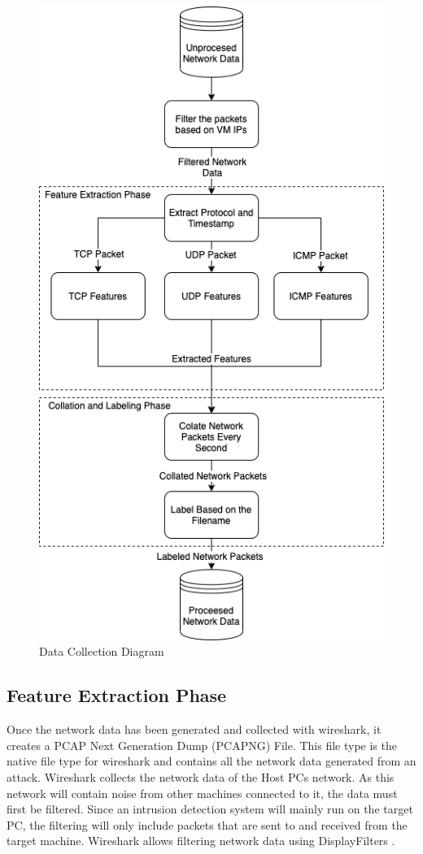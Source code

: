 \begin{figure}[H]
 \centering
 \includegraphics[scale = 0.5]{Images/datacollection.png}
 \caption{Data Collection Diagram}
 \label{fig:dcd}
\end{figure}
\subsection{Feature Extraction Phase}

Once the network data has been generated and collected with wireshark, it creates a PCAP Next Generation Dump (PCAPNG) File. This file type is the native file type for wireshark and contains all the network data generated from an attack. Wireshark collects the network data of the Host PCs network. As this network will contain noise from other machines connected to it, the data must first be filtered. Since an intrusion detection system will mainly run on the target PC, the filtering will only include packets that are sent to and received from the target machine. Wireshark allows filtering network data using DisplayFilters \cite{filters}. 

